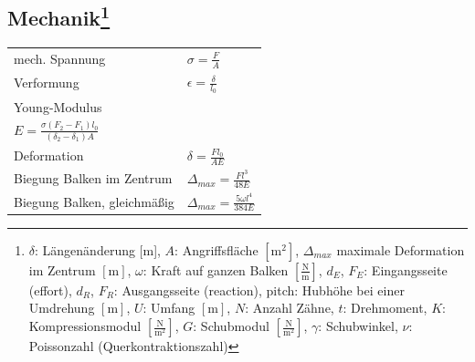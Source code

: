 \documentclass[12pt,a4paper]{article}
\renewcommand{\=}[1]{\stackrel{#1}{=}}
\theoremstyle{definition}
\theoremstyle{remark}
\begin{document}
\subsection[Mechanik]{Mechanik\let\thefootnote\relax\footnote{$\delta$: Längenänderung [m], $A$: Angriffsfläche $[\text{m}^2]$, $\Delta_{max}$ maximale Deformation im Zentrum $[\text{m}]$, $\omega$: Kraft auf ganzen Balken $[\frac{\text{N}}{\text{m}}]$, $d_E$, $F_E$: Eingangsseite (effort), $d_R$, $F_R$: Ausgangsseite (reaction), pitch: Hubhöhe bei einer Umdrehung $[\text{m}]$, $U$: Umfang $[\text{m}]$, $N$: Anzahl Zähne, $t$: Drehmoment, $K$: Kompressionsmodul $[\frac{\text{N}}{\text{m}^2}]$, $G$: Schubmodul $[\frac{\text{N}}{\text{m}^2}]$, $\gamma$: Schubwinkel, $\nu$: Poissonzahl (Querkontraktionszahl)}}
\begin{center}
\begin{minipage}[t]{.55\linewidth}
\vspace{0pt}
\begin{tabular}{ll}
mech. Spannung & $\sigma = \frac{F}{A}$\\
Verformung & $\epsilon = \frac{\delta}{l_0}$\\
Young-Modulus & \makecell[l]{$E = \frac{\sigma}{\epsilon}$\\ $E = \frac{\sigma (F_2 - F_1) l_0}{(\delta_2 - \delta_1)A}$}\\
Deformation & $\delta = \frac{F l_0}{AE}$\\
Biegung Balken im Zentrum & $\Delta_{max} = \frac{F l^3}{48 E}$\\
Biegung Balken, gleichmäßig & $\Delta_{max} = \frac{5 \omega l^4}{384 E}$\\


\end{tabular}
\end{minipage}
\end{center}
\end{document}
